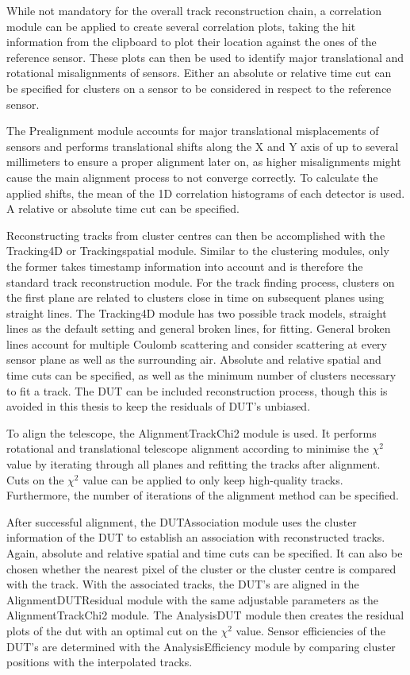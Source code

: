 While not mandatory for the overall track reconstruction chain, a correlation module can be applied to create several correlation plots, taking the hit information
from the clipboard to plot their location against the ones of the reference sensor. These plots can then be used to identify major translational and
rotational misalignments of sensors.  Either an absolute or relative time cut can be specified for clusters on a sensor to be considered in respect to
the reference sensor.

The Prealignment module accounts for major translational misplacements of sensors and performs translational shifts along the X and Y axis of up to several millimeters to ensure a proper alignment later on, as higher misalignments might cause the main alignment process to not converge correctly.
To calculate the applied shifts, the mean of the 1D correlation
histograms of each detector is used. A  relative or absolute time cut can be specified.

Reconstructing tracks from cluster centres can then be accomplished with the Tracking4D or Trackingspatial module. Similar to the clustering modules, only the former
takes timestamp information into account and is therefore the standard track reconstruction module. For the track finding process, clusters on the first plane are
related to clusters close in time on subsequent planes using straight lines.
The Tracking4D module has two possible track models, straight lines as the default setting and general
broken lines, for fitting. General broken lines account for multiple Coulomb scattering and consider scattering at every sensor plane as well as the surrounding air.
Absolute and relative spatial and time cuts can be specified, as well as the minimum number
of clusters necessary to fit a track. The DUT can be included reconstruction process, though this is avoided in this thesis to keep the residuals of DUT's unbiased.


To align the telescope, the AlignmentTrackChi2 module is used. It performs rotational and translational telescope
alignment according to minimise the $\chi^2$ value by iterating through all planes and refitting the tracks after alignment. Cuts on the $\chi^2$ value can be
applied to only keep high-quality tracks. Furthermore, the number of iterations of the alignment method can be specified.

After successful alignment, the DUTAssociation module uses the cluster information of the DUT to establish an association with reconstructed tracks. Again, absolute
and relative spatial and time cuts can be specified. It can also be chosen whether the nearest pixel of the cluster or the cluster centre is compared with the track.
With the associated tracks, the DUT's are aligned in the AlignmentDUTResidual module with the same adjustable parameters as the AlignmentTrackChi2 module.
The AnalysisDUT module then creates the residual plots of the dut with an optimal cut on the $\chi^2$ value. Sensor efficiencies of the DUT's are determined with the
AnalysisEfficiency module by comparing cluster positions with the interpolated tracks.



